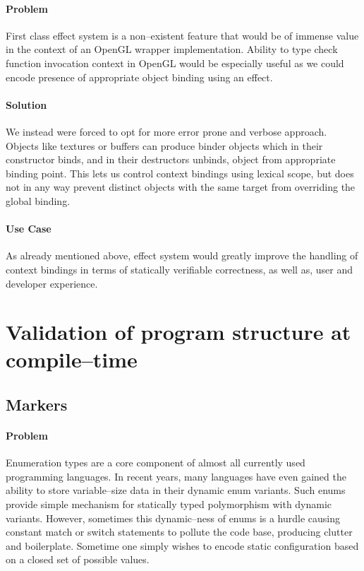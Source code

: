 \paragraph{Problem}

First class effect system is a non--existent feature that would be of immense value in the context of an OpenGL wrapper implementation.
Ability to type check function invocation context in OpenGL would be especially useful as we could encode presence of appropriate object binding using an effect.

\paragraph{Solution}

We instead were forced to opt for more error prone and verbose approach. 
Objects like textures or buffers can produce binder objects which in their constructor binds, and in their destructors unbinds, object from appropriate binding point.
This lets us control context bindings using lexical scope, but does not in any way prevent distinct objects with the same target from overriding the global binding.

\paragraph{Use Case}

As already mentioned above, effect system would greatly improve the handling of context bindings in terms of statically verifiable correctness, as well as, user and developer experience.

\section{Validation of program structure at compile--time}

\subsection{Markers}

\paragraph{Problem}

Enumeration types are a core component of almost all currently used programming languages. In recent years, many languages have even gained the ability to store variable--size data in their dynamic enum variants.
Such enums provide simple mechanism for statically typed polymorphism with dynamic variants. 
However, sometimes this dynamic--ness of enums is a hurdle causing constant match or switch statements to pollute the code base, producing clutter and boilerplate.
Sometime one simply wishes to encode static configuration based on a closed set of possible values.


